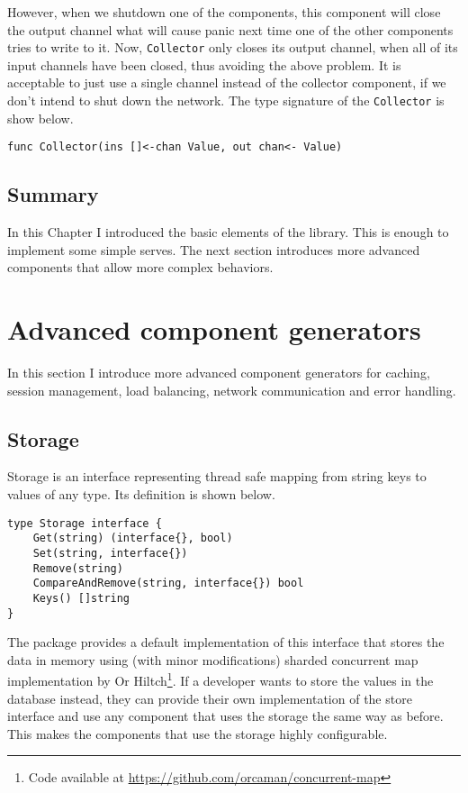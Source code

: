 \documentclass[12pt,a4paper]{article}
\begin{document}
However, when we shutdown
one of the components, this component will close the output channel
what will cause panic next time one of the other components tries to write
to it. Now, \texttt{Collector} only closes its output channel, when
all of its input channels have been closed, thus avoiding the above
problem. It is acceptable to just use a single channel instead of
the collector component, if we don't intend to shut down the network.
The type signature of the \texttt{Collector} is show below.
\begin{lstlisting}
func Collector(ins []<-chan Value, out chan<- Value)
\end{lstlisting}


\subsection{Summary}
In this Chapter I introduced the basic elements of the library. This 
is enough to implement some simple serves. The next section introduces
more advanced components that allow more complex behaviors.


\newpage
\section{Advanced component generators}
\label{sec:impl2}
In this section I introduce more advanced component generators for caching,
session management, load balancing, network communication and error handling.

\subsection{Storage}
Storage is an interface representing thread safe mapping from string keys
to values of any type. Its definition is shown below.
\begin{lstlisting}
type Storage interface {
    Get(string) (interface{}, bool)
    Set(string, interface{})
    Remove(string)
    CompareAndRemove(string, interface{}) bool
    Keys() []string
}
\end{lstlisting}
The package provides a default implementation of this interface that
stores the data in memory using (with minor modifications) sharded concurrent map implementation
by Or Hiltch\footnote{Code available at \url{https://github.com/orcaman/concurrent-map}}.
If a developer wants to store the values in the 
database instead, they can provide their own implementation of the store interface
and use any component that uses the storage the same way as before.
This makes the components that use the storage highly configurable.
\end{document}
